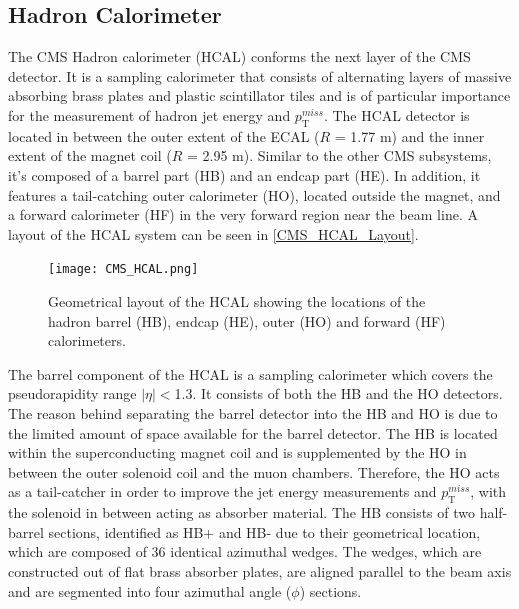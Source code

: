 \subsection{Hadron Calorimeter}

The CMS Hadron calorimeter (HCAL) conforms the next layer of the CMS detector. It is a sampling calorimeter that consists of alternating layers of massive absorbing brass plates and plastic scintillator tiles and is of particular importance for the measurement of hadron jet energy and  $p_\text{T}^{miss}$. The HCAL detector is located in between the outer extent of the ECAL ($R$ = 1.77 m) and the inner extent of the magnet coil ($R$ = 2.95 m). Similar to the other CMS subsystems, it's composed of a barrel part (HB) and an endcap part (HE). In addition, it features a tail-catching outer calorimeter (HO), located outside the magnet, and a forward calorimeter (HF) in the very forward region near the beam line. A layout of the HCAL system can be seen in \autoref{CMS_HCAL_Layout}.\\

\begin{figure}[tb]
\begin{center}
\texttt{[image: CMS\_HCAL.png]} 
\caption{Geometrical layout of the HCAL showing the locations of the hadron barrel (HB), endcap (HE), outer (HO) and forward (HF) calorimeters\cite{CMShcal}.}
\label{CMS_HCAL_Layout} 
\end{center}
\end{figure}

The barrel component of the HCAL is a sampling calorimeter which covers the pseudorapidity range $|\eta|<$1.3. It consists of both the HB and the HO detectors. The reason behind separating the barrel detector into the HB and HO is due to the limited amount of space available for the barrel detector. The HB is located within the superconducting magnet coil and is supplemented by the HO in between the outer solenoid coil and the muon chambers. Therefore, the HO acts as a tail-catcher in order to improve the jet energy measurements and $p_\text{T}^{miss}$, with the solenoid in between acting as absorber material. The HB consists of two half-barrel sections, identified as HB+ and HB- due to their geometrical location, which are composed of 36 identical azimuthal wedges. The wedges, which are constructed out of flat brass absorber plates, are aligned parallel to the beam axis and are segmented into four azimuthal angle ($\phi$) sections.\\ 

